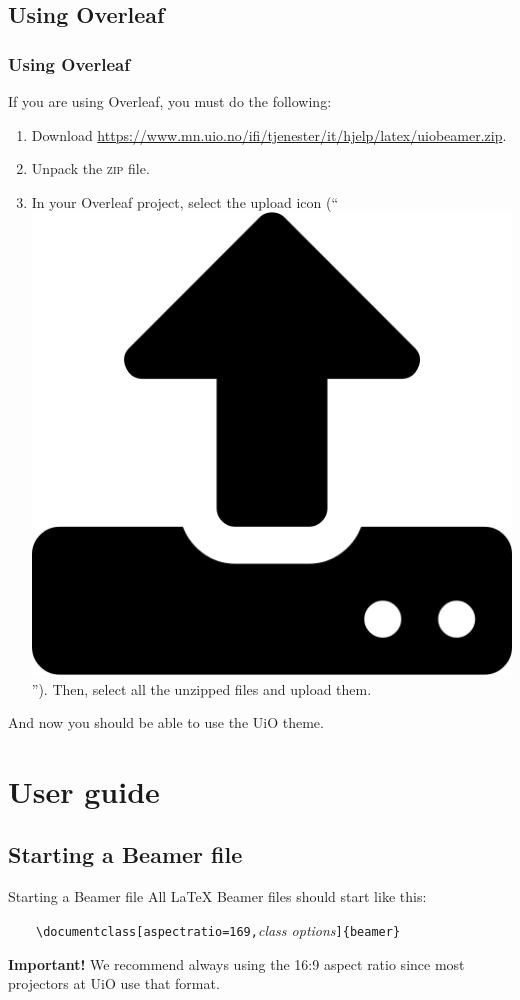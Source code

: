 \documentclass[UKenglish,aspectratio=169]{beamer}
\newcommand{\p}[1]{\texttt{#1}}
\newcommand{\pcmd}[1]{\p{\textbackslash #1}}
\newcommand{\ppar}[1]{\p{\{#1\}}}
\newcommand{\zip}{\textsc{zip}}
\begin{document}
\subsection{Using Overleaf}

\begin{frame}
  \frametitle{Using Overleaf}

  If you are using Overleaf, you must do the
  following:

\begin{enumerate}
\item Download 
  {\footnotesize\url{https://www.mn.uio.no/ifi/tjenester/it/hjelp/latex/uiobeamer.zip}}.

\item Unpack the \zip{} file.

\item In your Overleaf project, select the upload icon
  (``\includegraphics[height=2ex]{upload}''). Then, select all the
  unzipped files and upload them.
\end{enumerate}
And now you should be able to use the UiO theme.
\end{frame}

\section{User guide}
\subsection{Starting a Beamer file}

\begin{frame}{Starting a Beamer file}
  All \LaTeX{} Beamer files should start like this:

  \medskip
  ~~~~\pcmd{documentclass}\p{[aspectratio=169,}\textit{class
        options}\p{]}\ppar{beamer}

  \bigskip
  \begin{alert}{\textbf{Important!} }
    We recommend always using the 16:9 aspect ratio since most
    projectors at UiO use that format.
  \end{alert}
\end{frame}
\end{document}
